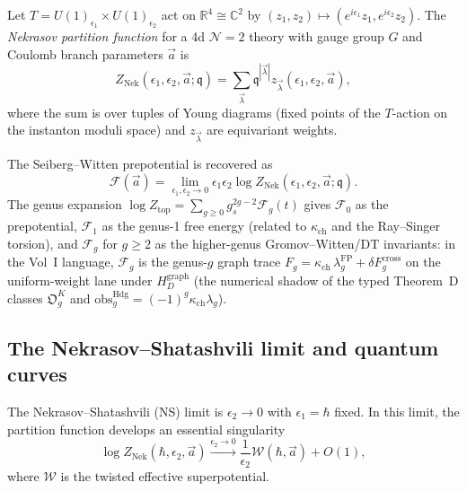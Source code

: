 Let $T = U(1)_{\epsilon_1} \times U(1)_{\epsilon_2}$ act on $\mathbb{R}^4 \cong \mathbb{C}^2$ by $(z_1, z_2) \mapsto (e^{i\epsilon_1}z_1, e^{i\epsilon_2}z_2)$. The
\emph{Nekrasov partition function} for a 4d $\mathcal{N}=2$ theory with gauge
group $G$ and Coulomb branch parameters $\vec{a}$ is
\begin{equation}\label{eq:phys-nekrasov-pf}
 Z_{\mathrm{Nek}}(\epsilon_1, \epsilon_2, \vec{a}; \mathfrak{q}) = \sum_{\vec{\lambda}}
 \mathfrak{q}^{|\vec{\lambda}|} z_{\vec{\lambda}}(\epsilon_1, \epsilon_2, \vec{a}),
\end{equation}
where the sum is over tuples of Young diagrams (fixed points of the $T$-action
on the instanton moduli space) and $z_{\vec{\lambda}}$ are equivariant weights.

\begin{theorem}[Nekrasov]
\label{thm:phys-nekrasov}
The Seiberg--Witten prepotential is recovered as
\begin{equation}\label{eq:phys-nekrasov-limit}
 \mathcal{F}(\vec{a}) = \lim_{\epsilon_1, \epsilon_2 \to 0}
 \epsilon_1\epsilon_2 \log Z_{\mathrm{Nek}}(\epsilon_1, \epsilon_2, \vec{a}; \mathfrak{q}).
\end{equation}
The genus expansion $\log Z_{\mathrm{top}} = \sum_{g \geq 0} g_s^{2g-2}\mathcal{F}_g(t)$
gives $\mathcal{F}_0$ as the prepotential, $\mathcal{F}_1$ as the genus-1
free energy (related to $\kappa_{\mathrm{ch}}$ and the Ray--Singer torsion),
and $\mathcal{F}_g$ for $g \geq 2$ as the higher-genus Gromov--Witten/DT
invariants: in the Vol~I language, $\mathcal{F}_g$ is the genus-$g$ graph trace
$F_g = \kappa_{\mathrm{ch}}\,\lambda_g^{\mathrm{FP}} + \delta F_g^{\mathrm{cross}}$
on the uniform-weight lane under $H_D^{\mathrm{graph}}$ (the numerical shadow
of the typed Theorem~D classes $\mathfrak O_g^K$ and
$\mathrm{obs}_g^{\mathrm{Hdg}} = (-1)^g\kappa_{\mathrm{ch}}\lambda_g$).
\end{theorem}

\subsection{The Nekrasov--Shatashvili limit and quantum curves}
\label{subsec:phys-ns-limit}

The Nekrasov--Shatashvili (NS) limit is $\epsilon_2 \to 0$ with
$\epsilon_1 = \hbar$ fixed. In this limit, the partition function develops
an essential singularity
\[
 \log Z_{\mathrm{Nek}}(\hbar, \epsilon_2, \vec{a})
 \xrightarrow{\epsilon_2 \to 0}
 \frac{1}{\epsilon_2}\mathcal{W}(\hbar, \vec{a}) + O(1),
\]
where $\mathcal{W}$ is the twisted effective superpotential.

